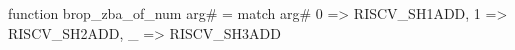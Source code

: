 function brop_zba_of_num arg# = match arg# {
  0 => RISCV_SH1ADD,
  1 => RISCV_SH2ADD,
  _ => RISCV_SH3ADD
}
